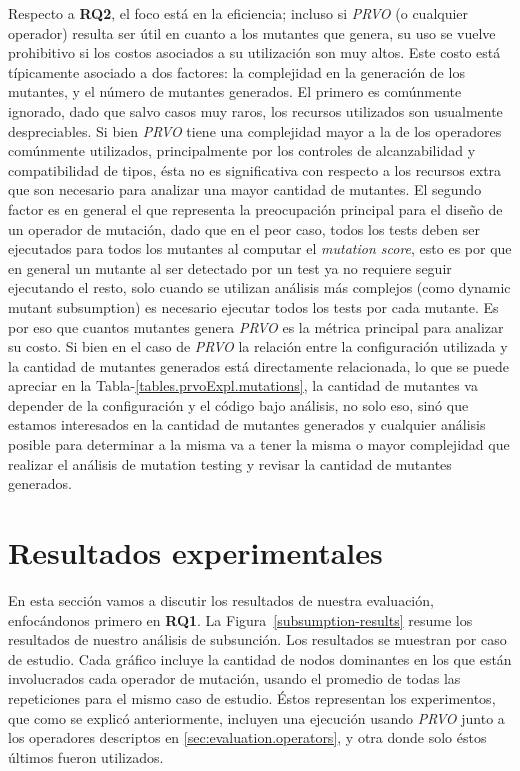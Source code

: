 Respecto a \textbf{RQ2}, el foco est\'a en la eficiencia; incluso si \emph{PRVO} (o cualquier operador) resulta ser \'util en cuanto a los mutantes que genera, su uso se vuelve prohibitivo si los costos asociados a su utilizaci\'on son muy altos. Este costo est\'a t\'ipicamente asociado a dos factores: la complejidad en la generaci\'on de los mutantes, y el n\'umero de mutantes generados. El primero es com\'unmente ignorado, dado que salvo casos muy raros, los recursos utilizados son usualmente despreciables. Si bien \emph{PRVO} tiene una complejidad mayor a la de los operadores com\'unmente utilizados, principalmente por los controles de alcanzabilidad y compatibilidad de tipos, \'esta no es significativa con respecto a los recursos extra que son necesario para analizar una mayor cantidad de mutantes. El segundo factor es en general el que representa la preocupaci\'on principal para el dise\~no de un operador de mutaci\'on, dado que en el peor caso, todos los tests deben ser ejecutados para todos los mutantes al computar el \emph{mutation score}, esto es por que en general un mutante al ser detectado por un test ya no requiere seguir ejecutando el resto, solo cuando se utilizan an\'alisis m\'as complejos (como dynamic mutant subsumption) es necesario ejecutar todos los tests por cada mutante. Es por eso que cuantos mutantes genera \emph{PRVO} es la m\'etrica principal para analizar su costo. Si bien en el caso de \emph{PRVO} la relaci\'on entre la configuraci\'on utilizada y la cantidad de mutantes generados est\'a directamente relacionada, lo que se puede apreciar en la Tabla-\ref{tables.prvoExpl.mutations}, la cantidad de mutantes va depender de la configuraci\'on y el c\'odigo bajo an\'alisis, no solo eso, sin\'o que estamos interesados en la cantidad de mutantes generados y cualquier an\'alisis posible para determinar a la misma va a tener la misma o mayor complejidad que realizar el an\'alisis de mutation testing y revisar la cantidad de mutantes generados.

\section{Resultados experimentales}
\label{sec:evaluation.results}

En esta secci\'on vamos a discutir los resultados de nuestra evaluaci\'on, enfoc\'andonos primero en \textbf{RQ1}. La Figura~\ref{subsumption-results} resume los resultados de nuestro an\'alisis de subsunci\'on. Los resultados se muestran por caso de estudio. Cada gr\'afico incluye la cantidad de nodos dominantes en los que est\'an involucrados cada operador de mutaci\'on, usando el promedio de todas las repeticiones para el mismo caso de estudio. \'Estos representan los experimentos, que como se explic\'o anteriormente, incluyen una ejecuci\'on usando \emph{PRVO} junto a los operadores descriptos en \ref{sec:evaluation.operators}, y otra donde solo \'estos \'ultimos fueron utilizados.

